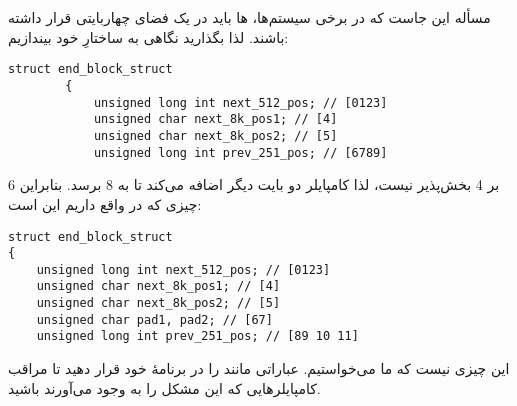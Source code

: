 \section{}
\paragraph{}\label{answer:103}
مسأله این جاست که در برخی سیستم‌ها، ها باید در یک فضای چهاربایتی قرار داشته باشند. لذا بگذارید نگاهی به ساختارِ خود بیندازیم:
\begin{LTR}
    \begin{lstlisting}[style=C++Style]
        struct end_block_struct
        {
            unsigned long int next_512_pos; // [0123]
            unsigned char next_8k_pos1; // [4]
            unsigned char next_8k_pos2; // [5]
            unsigned long int prev_251_pos; // [6789]
    \end{lstlisting}
\end{LTR}

6 بر 4 بخش‌پذیر نیست، لذا کامپایلر دو بایت دیگر اضافه می‌کند تا به 8 برسد. بنابراین چیزی که در واقع داریم این است:
\begin{LTR}
\begin{lstlisting}[style=C++Style]
struct end_block_struct
{
    unsigned long int next_512_pos; // [0123]
    unsigned char next_8k_pos1; // [4]
    unsigned char next_8k_pos2; // [5]
    unsigned char pad1, pad2; // [67]
    unsigned long int prev_251_pos; // [89 10 11]
\end{lstlisting}
\end{LTR}

این چیزی نیست که ما می‌خواستیم. عباراتی مانند  را در برنامهٔ خود قرار دهید تا مراقب کامپایلرهایی که این مشکل را به وجود می‌آورند باشید.